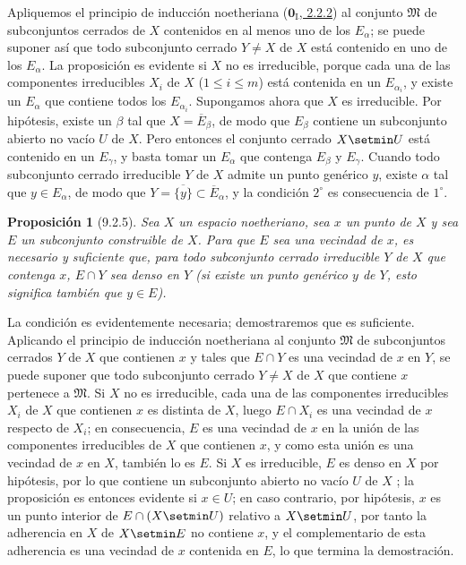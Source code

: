 \documentclass[10pt,oneside,openany]{book}
\theoremstyle{egaenv}\newtheorem*{env}{---}
\theoremstyle{egastatement}
\newtheorem*{proposition}{Proposición}
\theoremstyle{egadescription}
\newcommand{\oldpage}[2][]{\marginnote{\normalfont\scriptsize\textbf{#1}\,|\,#2}\ignorespaces}
\renewcommand{\leq}{\leqslant}
\begin{document}
Apliquemos el principio de inducción noetheriana
(\hyperref[0.2.2.2-fr]{$\mathbf{0}_{\mathrm I}$, 2.2.2}) al conjunto
$\mathfrak{M}$ de subconjuntos cerrados de $X$ contenidos en al menos uno de los $E_\alpha$; se puede suponer así que todo subconjunto cerrado $Y\ne X$ de $X$ está contenido en uno de los $E_\alpha$.
La proposición es evidente si $X$ no es irreducible, porque cada una de las componentes irreducibles $X_i$ de $X$ ($1\leq i\leq m$) está contenida en un $E_{\alpha_i}$, y existe un $E_\alpha$ que contiene todos los $E_{\alpha_i}$.
Supongamos ahora que $X$ es irreducible.
Por hipótesis, existe un $\beta$ tal que $X=\overline{E}_\beta$, de modo que  $E_\beta$ contiene un subconjunto abierto no vacío $U$ de $X$.
Pero entonces el conjunto cerrado $X\setmin U$ está contenido en un $E_\gamma$, y basta tomar un $E_\alpha$ que contenga $E_\beta$ y $E_\gamma$.
Cuando todo subconjunto cerrado irreducible $Y$ de $X$
\oldpage[0\textsubscript{III}]{16}
admite un punto genérico $y$, existe $\alpha$ tal que $y\in E_\alpha$, de modo que $Y=\overline{\{y\}}\subset\overline{E}_\alpha$, y la condición $2^\circ$ es consecuencia de $1^\circ$.

\begin{proposition}[9.2.5]
\label{0.9.2.5}
\label{0.9.2.5-fr}
Sea $X$ un espacio noetheriano, sea $x$ un punto de $X$ y sea $E$ un subconjunto construible de $X$.
Para que $E$ sea una vecindad de $x$, es necesario y suficiente que, para todo subconjunto cerrado irreducible $Y$ de $X$ que contenga $x$, $E\cap Y$ sea denso en $Y$ (si existe un punto genérico $y$ de $Y$, esto significa también  que $y\in E$).
\end{proposition}


La condición es evidentemente necesaria; demostraremos que es suficiente.
Aplicando el principio de inducción noetheriana al conjunto $\mathfrak{M}$ de subconjuntos cerrados $Y$ de $X$ que contienen $x$ y tales que $E\cap Y$ es una vecindad de $x$ en $Y$, se puede suponer que todo subconjunto cerrado $Y\ne X$ de $X$ que contiene $x$ pertenece a $\mathfrak{M}$.
Si $X$ no es irreducible, cada una de las componentes irreducibles $X_i$ de $X$ que contienen $x$ es distinta de $X$, luego $E\cap X_i$ es una vecindad de $x$ respecto de $X_i$; en consecuencia, $E$ es una vecindad de $x$ en la unión de las componentes irreducibles de $X$ que contienen $x$, y como esta unión es una vecindad de $x$ en $X$, también lo es $E$.
Si $X$ es irreducible, $E$ es denso en $X$ por hipótesis, por lo que contiene un subconjunto abierto no vacío $U$ de $X$ ; la proposición es entonces evidente si $x\in U$; en caso contrario, por hipótesis, $x$ es un punto interior de $E\cap(X\setmin U)$ relativo a $X\setmin U$, por tanto la adherencia en
$X$ de $X\setmin E$ no contiene $x$, y el complementario de esta adherencia es una vecindad de $x$ contenida en $E$, lo que termina la demostración.
\end{document}
